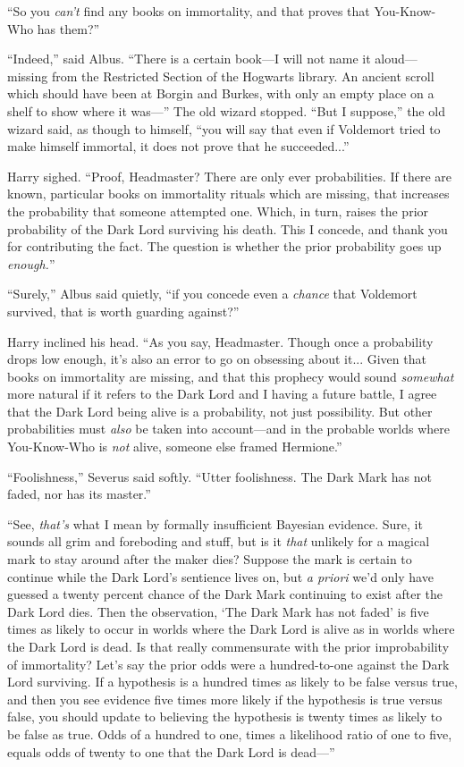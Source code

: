 “So you \emph{can’t} find any books on immortality, and that proves that You-Know-Who has them?”

“Indeed,” said Albus. “There is a certain book—I will not name it aloud—missing from the Restricted Section of the Hogwarts library. An ancient scroll which should have been at Borgin and Burkes, with only an empty place on a shelf to show where it was—” The old wizard stopped. “But I suppose,” the old wizard said, as though to himself, “you will say that even if Voldemort tried to make himself immortal, it does not prove that he succeeded...”

Harry sighed. “Proof, Headmaster? There are only ever probabilities. If there are known, particular books on immortality rituals which are missing, that increases the probability that someone attempted one. Which, in turn, raises the prior probability of the Dark Lord surviving his death. This I concede, and thank you for contributing the fact. The question is whether the prior probability goes up \emph{enough.}”

“Surely,” Albus said quietly, “if you concede even a \emph{chance} that Voldemort survived, that is worth guarding against?”

Harry inclined his head. “As you say, Headmaster. Though once a probability drops low enough, it’s also an error to go on obsessing about it... Given that books on immortality are missing, and that this prophecy would sound \emph{somewhat} more natural if it refers to the Dark Lord and I having a future battle, I agree that the Dark Lord being alive is a probability, not just possibility. But other probabilities must \emph{also} be taken into account—and in the probable worlds where You-Know-Who is \emph{not} alive, someone else framed Hermione.”

“Foolishness,” Severus said softly. “Utter foolishness. The Dark Mark has not faded, nor has its master.”

“See, \emph{that’s} what I mean by formally insufficient Bayesian evidence. Sure, it sounds all grim and foreboding and stuff, but is it \emph{that} unlikely for a magical mark to stay around after the maker dies? Suppose the mark is certain to continue while the Dark Lord’s sentience lives on, but \emph{a priori} we’d only have guessed a twenty percent chance of the Dark Mark continuing to exist after the Dark Lord dies. Then the observation, ‘The Dark Mark has not faded’ is five times as likely to occur in worlds where the Dark Lord is alive as in worlds where the Dark Lord is dead. Is that really commensurate with the prior improbability of immortality? Let’s say the prior odds were a hundred-to-one against the Dark Lord surviving. If a hypothesis is a hundred times as likely to be false versus true, and then you see evidence five times more likely if the hypothesis is true versus false, you should update to believing the hypothesis is twenty times as likely to be false as true. Odds of a hundred to one, times a likelihood ratio of one to five, equals odds of twenty to one that the Dark Lord is dead—”

